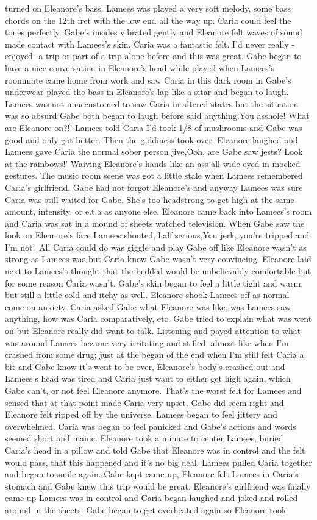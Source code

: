 \documentclass[12pt]{book}
\begin{document}
turned on Eleanore's bass. Lamees was played a very soft melody, some bass chords on the 12th fret with the low end all the way up. Caria could feel the tones perfectly. Gabe's insides vibrated gently and Eleanore felt waves of sound made contact with Lamees's skin. Caria was a fantastic felt. I'd never really -enjoyed- a trip or part of a trip alone before and this was great. Gabe began to have a nice conversation in Eleanore's head while played when Lamees's roommate came home from work and saw Caria in this dark room in Gabe's underwear played the bass in Eleanore's lap like a sitar and began to laugh. Lamees was not unaccustomed to saw Caria in altered states but the situation was so absurd Gabe both began to laugh before said anything.You asshole! What are Eleanore on?!' Lamees told Caria I'd took 1/8 of mushrooms and Gabe was good and only got better. Then the giddiness took over. Eleanore laughed and Lamees gave Caria the normal sober person jive,Ooh, are Gabe saw jests? Look at the rainbows!' Waiving Eleanore's hands like an ass all wide eyed in mocked gestures. The music room scene was got a little stale when Lamees remembered Caria's girlfriend. Gabe had not forgot Eleanore's and anyway Lamees was sure Caria was still waited for Gabe. She's too headstrong to get high at the same amount, intensity, or e.t.a as anyone else. Eleanore came back into Lamees's room and Caria was sat in a mound of sheets watched television. When Gabe saw the look on Eleanore's face Lamees shouted, half serious,You jerk, you're tripped and I'm not'. All Caria could do was giggle and play Gabe off like Eleanore wasn't as strong as Lamees was but Caria know Gabe wasn't very convincing. Eleanore laid next to Lamees's thought that the bedded would be unbelievably comfortable but for some reason Caria wasn't. Gabe's skin began to feel a little tight and warm, but still a little cold and itchy as well. Eleanore shook Lamees off as normal come-on anxiety. Caria asked Gabe what Eleanore was like, was Lamees saw anything, how was Caria comparatively, etc. Gabe tried to explain what was went on but Eleanore really did want to talk. Listening and payed attention to what was around Lamees became very irritating and stifled, almost like when I'm crashed from some drug; just at the began of the end when I'm still felt Caria a bit and Gabe know it's went to be over, Eleanore's body's crashed out and Lamees's head was tired and Caria just want to either get high again, which Gabe can't, or not feel Eleanore anymore. That's the worst felt for Lamees and sensed that at that point made Caria very upset. Gabe did seem right and Eleanore felt ripped off by the universe. Lamees began to feel jittery and overwhelmed. Caria was began to feel panicked and Gabe's actions and words seemed short and manic. Eleanore took a minute to center Lamees, buried Caria's head in a pillow and told Gabe that Eleanore was in control and the felt would pass, that this happened and it's no big deal. Lamees pulled Caria together and began to smile again. Gabe kept came up, Eleanore felt Lamees in Caria's stomach and Gabe knew this trip would be great. Eleanore's girlfriend was finally came up Lamees was in control and Caria began laughed and joked and rolled around in the sheets. Gabe began to get overheated again so Eleanore took 
\end{document}
